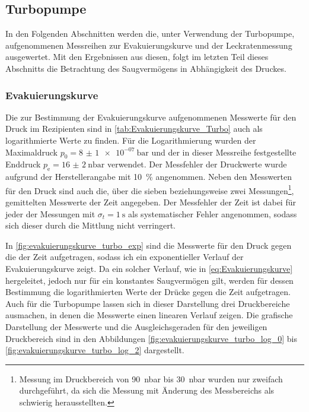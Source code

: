 



\FloatBarrier

\subsection{Turbopumpe}
In den Folgenden Abschnitten werden die, unter Verwendung der Turbopumpe, aufgenommenen Messreihen 
zur Evakuierungskurve und der Leckratenmessung ausgewertet. Mit den Ergebnissen aus diesen, folgt im letzten Teil dieses 
Abschnitts die Betrachtung des Saugvermögens in Abhängigkeit des Druckes.

\subsubsection{Evakuierungskurve}
Die zur Bestimmung der Evakuierungskurve aufgenommenen Messwerte für den Druck
im Rezipienten sind in \cref{tab:Evakuierungskurve_Turbo} auch als logarithmierte
Werte zu finden. Für die Logarithmierung wurden der Maximaldruck $p_{0} =\SI{8(1)e-07}{\bar} $
und der in dieser Messreihe festgestellte Enddruck $p_{\mathrm{e}} =\SI{16(2)}{\nano\bar}$ verwendet.
Der Messfehler der Druckwerte wurde aufgrund der Herstellerangabe \cite{DatenblattV70} mit \SI{10}{\percent} angenommen.
Neben den Messwerten für den Druck sind auch die, über die sieben beziehungsweise zwei Messungen\footnote{
Messung im Druckbereich von \SI{90}{\nano\bar} bis \SI{30}{\nano\bar} wurden nur zweifach durchgeführt,
da sich die Messung mit Änderung des Messbereichs als schwierig herausstellten.}, 
gemittelten Messwerte der Zeit angegeben. Der Messfehler der Zeit ist dabei für jeder der Messungen mit
$\sigma_{t} = \SI{1}{\s}$ als systematischer Fehler angenommen, sodass sich dieser durch die Mittlung nicht verringert.


In \cref{fig:evakuierungskurve_turbo_exp} sind die Messwerte für den Druck gegen die der Zeit aufgetragen,
sodass ich ein exponentieller Verlauf der Evakuierungskurve zeigt. Da ein solcher Verlauf, wie in 
\eqref{eq:Evakuierungskurve} hergeleitet, jedoch nur für ein konstantes Saugvermögen gilt, werden für dessen Bestimmung die logarithmierten Werte der Drücke gegen die Zeit aufgetragen.
Auch für die Turbopumpe lassen sich in dieser Darstellung drei Druckbereiche ausmachen,
in denen die Messwerte einen linearen Verlauf zeigen. Die grafische Darstellung der Messwerte und die 
Ausgleichsgeraden für den jeweiligen Druckbereich sind in den Abbildungen \ref{fig:evakuierungskurve_turbo_log_0} 
bis \ref{fig:evakuierungskurve_turbo_log_2} dargestellt.\\

